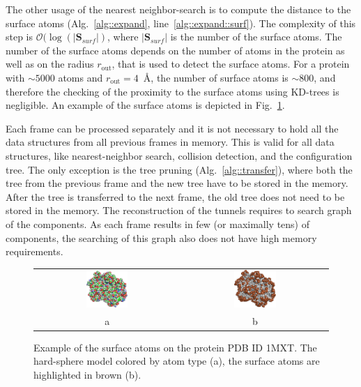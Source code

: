 \documentclass[usletter, 10pt, conference]{svjour3}      %
\def\gprobe{r_{\mathrm{out}}}
\def\SSA{\mathbf{S}_{surf}}
\begin{document}
The other usage of the nearest neighbor-search is to compute the distance to the surface atoms (Alg.~\ref{alg::expand}, line~\ref{alg::expand::surf}).
The complexity of this step is $\mathcal{O}(\log( |\SSA|)$, where $|\SSA|$ is the number of the surface atoms.
The number of the surface atoms depends on the number of atoms in the protein as well as on the radius $\gprobe$, that is used to detect the surface atoms.
For a protein with $\sim 5000$ atoms and $\gprobe=4$~\AA, the number of surface atoms is $\sim800$, and therefore the checking of the proximity to the surface atoms using KD-trees is negligible. 
An example of the surface atoms is depicted in Fig.~\ref{fig::surface}.

Each frame can be processed separately and it is not necessary to hold all the data structures from all previous frames in memory.
This is valid for all data structures, like nearest-neighbor search, collision detection, and the configuration tree.
The only exception is the tree pruning (Alg.~\ref{alg::transfer}), where both the tree from the previous frame and the new tree have to be stored in the memory.
After the tree is transferred to the next frame, the old tree does not need to be stored in the memory.
The reconstruction of the tunnels requires to search graph of the components. 
As each frame results in few (or maximally tens) of components, the searching of this graph also does not have high memory requirements.


\begin{figure}
\centering
\begin{tabular}{cc}
\includegraphics[width=0.3\textwidth]{fig/1mxta-alpha4} &
\includegraphics[width=0.3\textwidth]{fig/1mxta-alpha3} \\
a & b
\end{tabular}
\caption{\label{fig::surface}
Example of the surface atoms on the protein PDB ID 1MXT. The hard-sphere model colored by atom type (a), the surface atoms are highlighted in brown (b).
}
\end{figure}
\end{document}
